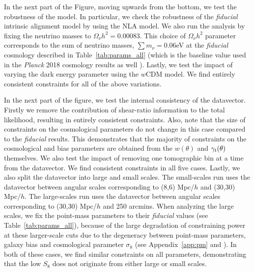 \documentclass[aps, prd,twocolumn,superscriptaddress,nofootinbib,preprintnumbers]{revtex4-1}
\newcommand{\gammat}{\ensuremath{\gamma_{\rm t}(\theta)}}
\newcommand{\wtheta}{\ensuremath{w(\theta)}}
\begin{document}
In the next part of the Figure, moving upwards from the bottom, we test the robustness of the model. In particular, we check the robustness of the \textit{fiducial} intrinsic alignment model by using the NLA model. We also run the analysis by fixing the neutrino masses to $\Omega_{\nu}h^2 = 0.00083$. This choice of $\Omega_{\nu}h^2$ parameter corresponds to the sum of neutrino masses, $\sum m_{\nu}=0.06$eV at the \textit{fiducial} cosmology described in Table~\ref{tab:params_all} (which is the baseline value used in the \textit{Planck} 2018 cosmology results as well \citep{Planck_2018_cosmo}). Lastly, we test the impact of varying the dark energy parameter using the $w$CDM model. We find entirely consistent constraints for all of the above variations. 

In the next part of the figure, we test the internal consistency of the datavector. Firstly we remove the contribution of shear-ratio information to the total likelihood, resulting in entirely consistent constraints. Also, note that the size of constraints on the cosmological parameters do not change in this case compared to the \textit{fiducial} results. This demonstrates that the majority of constraints on the cosmological and bias parameters are obtained from the $\wtheta$ and $\gammat$ themselves. We also test the impact of removing one tomographic bin at a time from the datavector. We find consistent constraints in all five cases. %
Lastly, we also split the datavector into large and small scales. The small-scales run uses the datavector between  angular scales corresponding to (8,6) Mpc/$h$ and (30,30) Mpc/$h$. The large-scales run uses the datavector between angular scales corresponding to (30,30) Mpc/$h$ and 250 arcmins. When analyzing the large scales, we fix the point-mass parameters to their \textit{fiducial} values (see Table~\ref{tab:params_all}), because of the large degradation of constraining power at these larger-scale cuts due to the degeneracy between point-mass parameters, galaxy bias and cosmological parameter $\sigma_8$ (see Appendix~\ref{app:pm} and \citet{MacCrann:2019ntb}). In both of these cases, we find similar constraints on all parameters, demonstrating that the low $S_8$ does not originate from either large or small scales.
\end{document}
